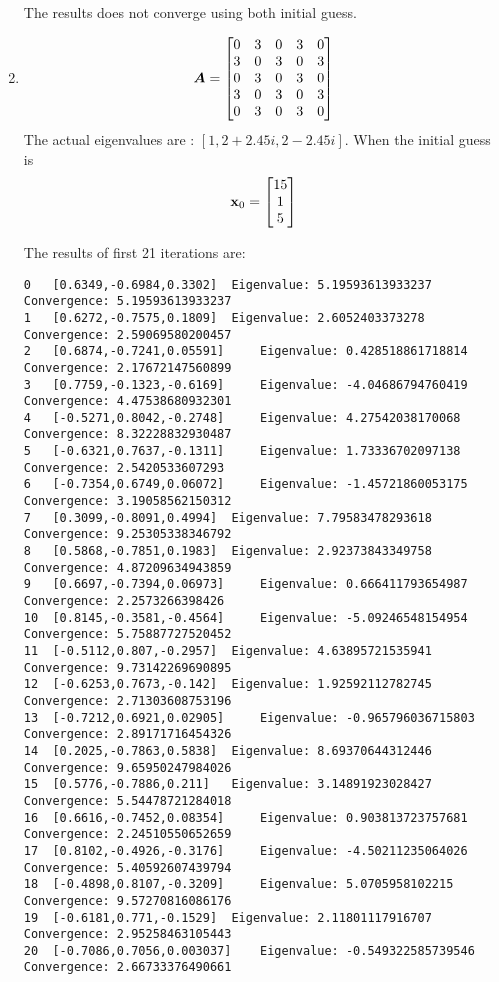 \documentclass{article}
\begin{document}
\begin{enumerate}
The results does not converge using both initial guess. 

\item 
\begin{align}
\boldsymbol{A}=\begin{bmatrix} 
0 & 3 & 0 & 3 & 0   \\  
3 & 0 & 3 & 0 & 3   \\  
0 & 3 & 0 & 3 & 0   \\  
3 & 0 & 3 & 0 & 3   \\  
0 & 3 & 0 & 3 & 0  \\   \end{bmatrix}
\end{align}
The actual eigenvalues are : $[1,  2+2.45i, 2-2.45i] $.  
When the initial guess is 
\begin{align}
\boldsymbol{\mathrm{x}}_0=\begin{bmatrix} 15\\1\\5 \end{bmatrix}
\end{align}

The results of first 21 iterations are: 
\begin{verbatim}
0	[0.6349,-0.6984,0.3302]	 Eigenvalue: 5.19593613933237	 Convergence: 5.19593613933237
1	[0.6272,-0.7575,0.1809]	 Eigenvalue: 2.6052403373278	 Convergence: 2.59069580200457
2	[0.6874,-0.7241,0.05591]	 Eigenvalue: 0.428518861718814	 Convergence: 2.17672147560899
3	[0.7759,-0.1323,-0.6169]	 Eigenvalue: -4.04686794760419	 Convergence: 4.47538680932301
4	[-0.5271,0.8042,-0.2748]	 Eigenvalue: 4.27542038170068	 Convergence: 8.32228832930487
5	[-0.6321,0.7637,-0.1311]	 Eigenvalue: 1.73336702097138	 Convergence: 2.5420533607293
6	[-0.7354,0.6749,0.06072]	 Eigenvalue: -1.45721860053175	 Convergence: 3.19058562150312
7	[0.3099,-0.8091,0.4994]	 Eigenvalue: 7.79583478293618	 Convergence: 9.25305338346792
8	[0.5868,-0.7851,0.1983]	 Eigenvalue: 2.92373843349758	 Convergence: 4.87209634943859
9	[0.6697,-0.7394,0.06973]	 Eigenvalue: 0.666411793654987	 Convergence: 2.2573266398426
10	[0.8145,-0.3581,-0.4564]	 Eigenvalue: -5.09246548154954	 Convergence: 5.75887727520452
11	[-0.5112,0.807,-0.2957]	 Eigenvalue: 4.63895721535941	 Convergence: 9.73142269690895
12	[-0.6253,0.7673,-0.142]	 Eigenvalue: 1.92592112782745	 Convergence: 2.71303608753196
13	[-0.7212,0.6921,0.02905]	 Eigenvalue: -0.965796036715803	 Convergence: 2.89171716454326
14	[0.2025,-0.7863,0.5838]	 Eigenvalue: 8.69370644312446	 Convergence: 9.65950247984026
15	[0.5776,-0.7886,0.211]	 Eigenvalue: 3.14891923028427	 Convergence: 5.54478721284018
16	[0.6616,-0.7452,0.08354]	 Eigenvalue: 0.903813723757681	 Convergence: 2.24510550652659
17	[0.8102,-0.4926,-0.3176]	 Eigenvalue: -4.50211235064026	 Convergence: 5.40592607439794
18	[-0.4898,0.8107,-0.3209]	 Eigenvalue: 5.0705958102215	 Convergence: 9.57270816086176
19	[-0.6181,0.771,-0.1529]	 Eigenvalue: 2.11801117916707	 Convergence: 2.95258463105443
20	[-0.7086,0.7056,0.003037]	 Eigenvalue: -0.549322585739546	 Convergence: 2.66733376490661
\end{verbatim}


\end{enumerate}
\end{document}
